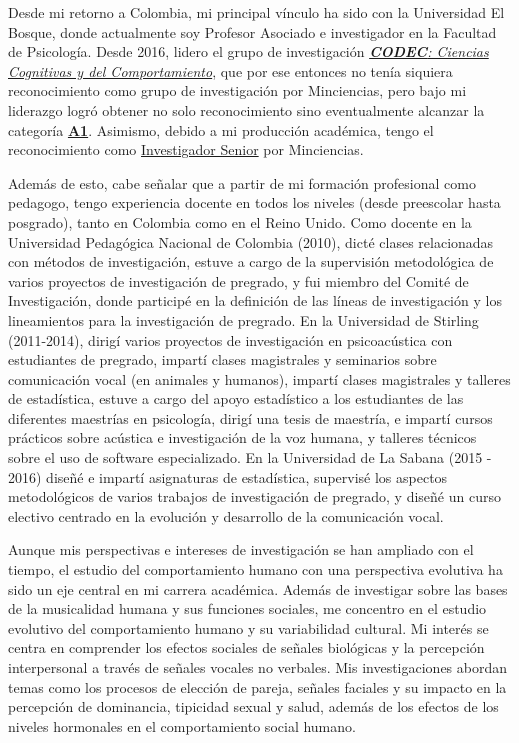 \documentclass[11pt,a4paper,]{awesome-cv}
\begin{document}
\begin{small}
Desde mi retorno a Colombia, mi principal vínculo ha sido con la Universidad El Bosque, donde actualmente soy Profesor Asociado e investigador en la Facultad de Psicología. Desde 2016, lidero el grupo de investigación \href{https://grupo-codec.netlify.app/}{\textit{\textbf{CODEC}: Ciencias Cognitivas y del Comportamiento}}, que por ese entonces no tenía siquiera reconocimiento como grupo de investigación por Minciencias, pero bajo mi liderazgo logró obtener no solo reconocimiento sino eventualmente alcanzar la categoría \textbf{\href{https://scienti.minciencias.gov.co/gruplac/jsp/visualiza/visualizagr.jsp?nro=00000000001446}{A1}}. Asimismo, debido a mi producción académica, tengo el reconocimiento como \href{https://scienti.minciencias.gov.co/cvlac/visualizador/generarCurriculoCv.do?cod_rh=0001348945}{Investigador Senior} por Minciencias.

Además de esto, cabe señalar que a partir de mi formación profesional como pedagogo, tengo experiencia docente en todos los niveles (desde preescolar hasta posgrado), tanto en Colombia como en el Reino Unido. Como docente en la Universidad Pedagógica Nacional de Colombia (2010), dicté clases relacionadas con métodos de investigación, estuve a cargo de la supervisión metodológica de varios proyectos de investigación de pregrado, y fui miembro del Comité de Investigación, donde participé en la definición de las líneas de investigación y los lineamientos para la investigación de pregrado. En la Universidad de Stirling (2011-2014), dirigí varios proyectos de investigación en psicoacústica con estudiantes de pregrado, impartí clases magistrales y seminarios sobre comunicación vocal (en animales y humanos), impartí clases magistrales y talleres de estadística, estuve a cargo del apoyo estadístico a los estudiantes de las diferentes maestrías en psicología, dirigí una tesis de maestría, e impartí cursos prácticos sobre acústica e investigación de la voz humana, y talleres técnicos sobre el uso de software especializado. En la Universidad de La Sabana (2015 - 2016) diseñé e impartí asignaturas de estadística, supervisé los aspectos metodológicos de varios trabajos de investigación de pregrado, y diseñé un curso electivo centrado en la evolución y desarrollo de la comunicación vocal.

Aunque mis perspectivas e intereses de investigación se han ampliado con el tiempo, el estudio del comportamiento humano con una perspectiva evolutiva ha sido un eje central en mi carrera académica. Además de investigar sobre las bases de la musicalidad humana y sus funciones sociales, me concentro en el estudio evolutivo del comportamiento humano y su variabilidad cultural. Mi interés se centra en comprender los efectos sociales de señales biológicas y la percepción interpersonal a través de señales vocales no verbales. Mis investigaciones abordan temas como los procesos de elección de pareja, señales faciales y su impacto en la percepción de dominancia, tipicidad sexual y salud, además de los efectos de los niveles hormonales en el comportamiento social humano.


\end{small}
\end{document}
